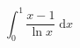 \documentclass{article}
\begin{document}
\[ \int_0^1 \frac{x - 1}{\ln{x}} \; \mathrm{d}x \]
\end{document}
